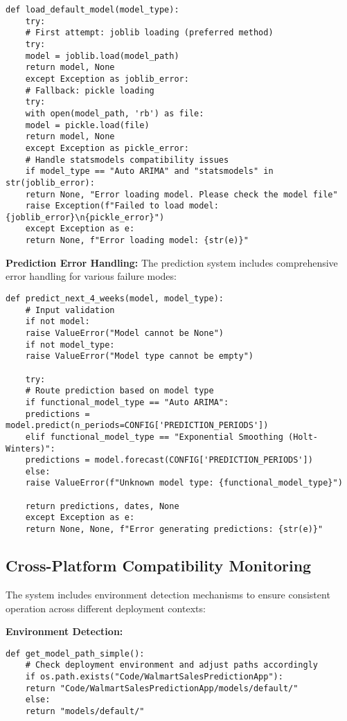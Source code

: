 \begin{lstlisting}[language=MyPython, caption={Robust Model Loading with Fallback Mechanisms}]
	def load_default_model(model_type):
	try:
	# First attempt: joblib loading (preferred method)
	try:
	model = joblib.load(model_path)
	return model, None
	except Exception as joblib_error:
	# Fallback: pickle loading
	try:
	with open(model_path, 'rb') as file:
	model = pickle.load(file)
	return model, None
	except Exception as pickle_error:
	# Handle statsmodels compatibility issues
	if model_type == "Auto ARIMA" and "statsmodels" in str(joblib_error):
	return None, "Error loading model. Please check the model file"
	raise Exception(f"Failed to load model: {joblib_error}\n{pickle_error}")
	except Exception as e:
	return None, f"Error loading model: {str(e)}"
\end{lstlisting}

\textbf{Prediction Error Handling:}
The prediction system includes comprehensive error handling for various failure modes:

\begin{lstlisting}[language=MyPython, caption={Prediction Error Handling System}]
	def predict_next_4_weeks(model, model_type):
	# Input validation
	if not model:
	raise ValueError("Model cannot be None")
	if not model_type:
	raise ValueError("Model type cannot be empty")
	
	try:
	# Route prediction based on model type
	if functional_model_type == "Auto ARIMA":
	predictions = model.predict(n_periods=CONFIG['PREDICTION_PERIODS'])
	elif functional_model_type == "Exponential Smoothing (Holt-Winters)":
	predictions = model.forecast(CONFIG['PREDICTION_PERIODS'])
	else:
	raise ValueError(f"Unknown model type: {functional_model_type}")
	
	return predictions, dates, None
	except Exception as e:
	return None, None, f"Error generating predictions: {str(e)}"
\end{lstlisting}

\subsection{Cross-Platform Compatibility Monitoring}

The system includes environment detection mechanisms to ensure consistent operation across different deployment contexts:

\textbf{Environment Detection:}
\begin{lstlisting}[language=MyPython, caption={Cross-Platform Environment Detection}]
	def get_model_path_simple():
	# Check deployment environment and adjust paths accordingly
	if os.path.exists("Code/WalmartSalesPredictionApp"):
	return "Code/WalmartSalesPredictionApp/models/default/"
	else:
	return "models/default/"
\end{lstlisting}

